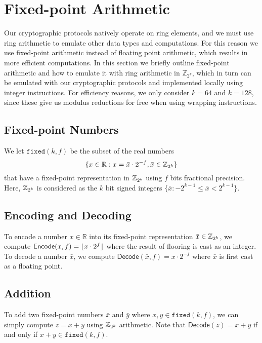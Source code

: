\section{Fixed-point Arithmetic}
\label{sec:fixed-point}


Our cryptographic protocols natively operate on ring elements, and we must use ring arithmetic to emulate other data types and computations. For this reason we use fixed-point arithmetic instead of floating point arithmetic, which results in more efficient computations. In this section we briefly outline fixed-point arithmetic and how to emulate it with ring arithmetic in $\mathbb{Z}_{2^k}$, which in turn can be emulated with our cryptographic protocols and implemented locally using integer instructions. For efficiency reasons, we only consider $k = 64$ and $k = 128$, since these give us modulus reductions for free when using wrapping instructions.

\subsection{Fixed-point Numbers}
We let $\mathtt{fixed}(k, f)$ be the subset of the real numbers
$$
\{x \in \mathbb{R} : x = \bar{x} \cdot 2^{-f}, \bar{x} \in \mathbb{Z}_{2^k} \}
$$
that have a fixed-point representation in $\mathbb{Z}_{2^k}$ using $f$ bits fractional precision. Here, $\mathbb{Z}_{2^k}$ is considered as the $k$ bit signed integers $\{ \bar{x} : -2^{k-1} \leq \bar{x} < 2^{k-1} \}$.

\subsection{Encoding and Decoding}
To encode a number $x \in \mathbb{R}$ into its fixed-point representation $\bar{x} \in \mathbb{Z}_{2^k}$, we compute $\mathsf{Encode}(x, f) = \lfloor x \cdot 2^f\rfloor$ where the result of flooring is cast as an integer. To decode a number $\bar{x}$, we compute $\mathsf{Decode}(\bar{x}, f) = x \cdot 2^{-f}$ where $\bar{x}$ is first cast as a floating point.

\subsection{Addition}
To add two fixed-point numbers $\bar{x}$ and $\bar{y}$ where $x,y \in \mathtt{fixed}(k, f)$, we can simply compute $\bar{z} = \bar{x} + \bar{y}$ using $\mathbb{Z}_{2^k}$ arithmetic. Note that $\mathsf{Decode}(\bar{z}) = x + y$ if and only if $x + y \in \mathtt{fixed}(k, f)$.


